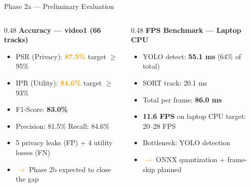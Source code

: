 \documentclass[aspectratio=169]{beamer}
\begin{document}
\begin{frame}{Phase 2a — Preliminary Evaluation}
\begin{columns}[T]
\begin{column}{0.48\textwidth}
  \textbf{Accuracy — video1 (66 tracks)}
  \begin{itemize}\setlength{\itemsep}{0.28cm}
    \item PSR (Privacy): \textcolor{orange}{\textbf{87.5\%}} \quad target $\geq$95\%
    \item IPR (Utility): \textcolor{orange}{\textbf{84.6\%}} \quad target $\geq$93\%
    \item F1-Score: \textbf{83.0\%}
    \item Precision: 81.5\% \quad Recall: 84.6\%
    \item 5 privacy leaks (FP) + 4 utility losses (FN)
    \item \textcolor{orange}{$\rightarrow$} Phase 2b expected to close the gap
  \end{itemize}
\end{column}
\begin{column}{0.48\textwidth}
  \textbf{FPS Benchmark — Laptop CPU}
  \begin{itemize}\setlength{\itemsep}{0.28cm}
    \item YOLO detect: \textbf{55.1 ms} (64\% of total)
    \item SORT track: 20.1 ms
    \item Total per frame: \textbf{86.0 ms}
    \item \textbf{11.6 FPS} on laptop CPU \quad target: 20--28 FPS
    \item Bottleneck: YOLO detection
    \item \textcolor{orange}{$\rightarrow$} ONNX quantization + frame-skip planned
  \end{itemize}
\end{column}
\end{columns}
\end{frame}
\end{document}
